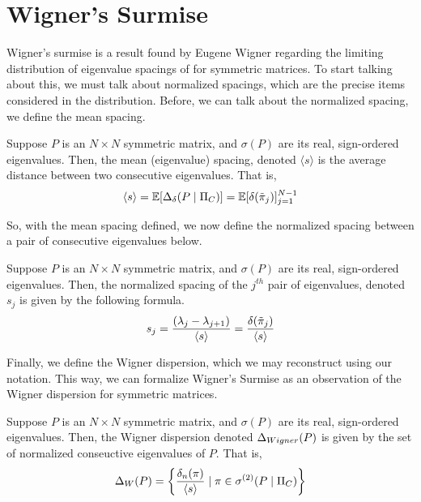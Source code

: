 \section{Wigner's Surmise}


Wigner's surmise is a result found by Eugene Wigner regarding the limiting distribution of eigenvalue spacings of for symmetric matrices.
To start talking about this, we must talk about normalized spacings, which are the precise items considered in the distribution.
Before, we can talk about the normalized spacing, we define the mean spacing.

\begin{definition}
Suppose $P$ is an $N \times N$ symmetric matrix, and $\sigma(P)$ are its real, sign-ordered eigenvalues.
Then, the mean (eigenvalue) spacing, denoted $\langle s \rangle$ is the average distance between two consecutive eigenvalues. That is,
$$\langle s \rangle = \mathbb{E}[\Delta_\delta(P \mid \Pi_C)] = \mathbb{E}[\delta({\tilde{\pi}}_{j})]_{j = 1}^{N - 1}$$
\end{definition}

\noindent So, with the mean spacing defined, we now define the normalized spacing between a pair of consecutive eigenvalues below.

\begin{definition}
Suppose $P$ is an $N \times N$ symmetric matrix, and $\sigma(P)$ are its real, sign-ordered eigenvalues.
Then, the normalized spacing of the $j^{th}$ pair of eigenvalues, denoted $s_j$ is given by the following formula.
$$s_j = \frac{(\lambda_j - \lambda_{j+1})}{{\langle s \rangle}} = \frac{\delta({\tilde{\pi}}_{j})}{\langle s \rangle}$$
\end{definition}

Finally, we define the Wigner dispersion, which we may reconstruct using our notation. This way, we can formalize Wigner's Surmise as
an observation of the Wigner dispersion for symmetric matrices.

\begin{definition}
Suppose $P$ is an $N \times N$ symmetric matrix, and $\sigma(P)$ are its real, sign-ordered eigenvalues.
Then, the Wigner dispersion denoted $\Delta_{Wigner}(P)$ is given by the set of normalized conseuctive eigenvalues of $P$. That is,
$$ \Delta_{W}(P) = \left\{ \frac{\delta_n(\pi)}{{\langle s \rangle}} \mid \pi \in {\sigma^{(2)}}(P \mid \Pi_C) \right\} $$
\end{definition}

